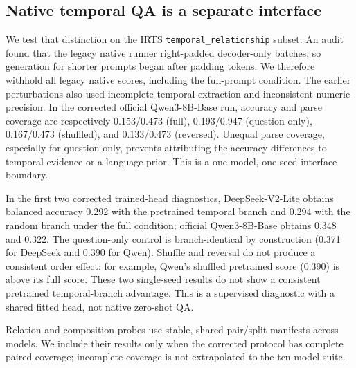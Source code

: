 \subsection{Native temporal QA is a separate interface}

We test that distinction on the IRTS \texttt{temporal\_relationship} subset.
An audit found that the legacy native runner right-padded decoder-only batches,
so generation for shorter prompts began after padding tokens.  We therefore
withhold all legacy native scores, including the full-prompt condition.  The
earlier perturbations also used incomplete temporal extraction and inconsistent
numeric precision.  In the corrected official Qwen3-8B-Base run, accuracy and
parse coverage are respectively 0.153/0.473 (full), 0.193/0.947
(question-only), 0.167/0.473 (shuffled), and 0.133/0.473 (reversed).  Unequal
parse coverage, especially for question-only, prevents attributing the accuracy
differences to temporal evidence or a language prior.  This is a one-model,
one-seed interface boundary.

In the first two corrected trained-head diagnostics, DeepSeek-V2-Lite obtains
balanced accuracy 0.292 with the pretrained temporal branch and 0.294 with the
random branch under the full condition; official Qwen3-8B-Base obtains 0.348
and 0.322.  The question-only control is branch-identical by construction
(0.371 for DeepSeek and 0.390 for Qwen).  Shuffle and reversal do not produce a
consistent order effect: for example, Qwen's shuffled pretrained score (0.390)
is above its full score.  These two single-seed results do not show a consistent
pretrained temporal-branch advantage.  This is a supervised diagnostic with a
shared fitted head, not native zero-shot QA.

Relation and composition probes use stable, shared pair/split manifests across
models.  We include their results only when the corrected protocol has complete
paired coverage; incomplete coverage is not extrapolated to the ten-model
suite.
